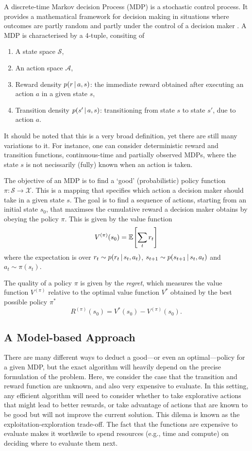 A discrete-time Markov decision Process (MDP) is a stochastic control process. It provides a mathematical framework for decision making in situations where outcomes are partly random and partly under the control of a decision maker \citep{sutton2018reinforcemnt}. A MDP is characterised by a 4-tuple, consiting of
\begin{enumerate}
    \item A state space $\mathcal{S}$,
    \item An action space $\mathcal{A}$,
    \item Reward density $p(r \,|\, a, s)$: the immediate reward obtained after executing an action $a$ in a given state $s$,
    \item Transition density $p(s' \,|\, a, s)$: transitioning from state $s$ to state $s'$, due to action $a$.
\end{enumerate}
It should be noted that this is a very broad definition, yet there are still many variations to it. For instance, one can consider deterministic reward and transition functions, continuous-time and partially observed MDPs, where the state $s$ is not necissarily (fully) known when an action is taken.

The objective of an MDP is to find a `good' (probabilistic) policy function $\pi:\mathcal{S} \rightarrow \mathcal{X}$. This is a mapping that specifies which action a decision maker should take in a given state $s$. The goal is to find a sequence of actions, starting from an initial state $s_0$, that maximses the cumulative reward a decision maker obtains by obeying the policy $\pi$. This is given by the value function
\begin{equation}
    V^{(\pi)}(s_0) = \Exp{}{\sum_t r_t}
\end{equation}
where the expectation is over $r_t \sim p(r_t \,|\, s_t, a_t)$, $s_{t+1} \sim p(s_{t+1} \,|\, s_t, a_t)$ and $a_t \sim \pi(s_t)$.

The quality of a policy $\pi$ is given by the \emph{regret}, which measures the value function $V^{(\pi)}$ relative to the optimal value function $V^{*}$ obtained by the best possible policy $\pi^*$
\begin{equation}
    R^{(\pi)}(s_0) = V^*(s_0) - V^{(\pi)}(s_0). 
\end{equation}

\subsection{A Model-based Approach}
There are many different ways to deduct a good---or even an optimal---policy for a given MDP, but the exact algorithm will heavily depend on the precise formulation of the problem. Here, we consider the case that the transition and reward function are unknown, and also very expensive to evaluate. In this setting, any efficient algorithm will need to consider whether to take explorative actions that might lead to better rewards, or take advantage of actions that are known to be good but will not improve the current solution. This dilema is known as the exploitation-exploration trade-off. The fact that the functions are expensive to evaluate makes it worthwile to spend resources (e.g., time and compute) on deciding where to evaluate them next.

